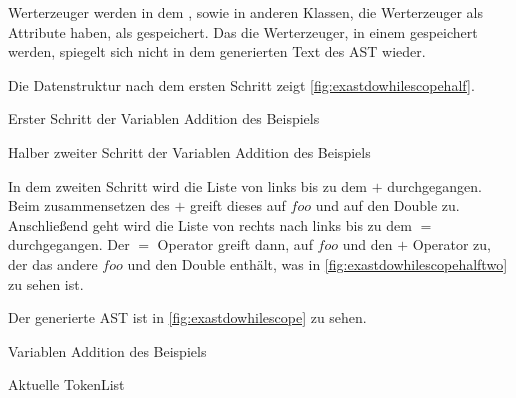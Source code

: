 {{        Werterzeuger werden in dem , sowie in anderen Klassen, die Werterzeuger als Attribute haben, als  gespeichert. Das die Werterzeuger, in einem  gespeichert werden, spiegelt sich nicht in dem generierten Text des AST wieder.

        Die Datenstruktur nach dem ersten Schritt zeigt \autoref{fig:exastdowhilescopehalf}.
        \begin{paracol}{2}
          \begin{myCodeEnv}
            \centering
            \begin{myInvBox}[width=.9\linewidth]
              
            \end{myInvBox}
            \caption{Erster Schritt der Variablen Addition des Beispiels}
            \label{fig:exastdowhilescopehalf}
          \end{myCodeEnv}
          \switchcolumn
          \begin{myCodeEnv}
            \centering
            \begin{myInvBox}[width=.9\linewidth]
              
            \end{myInvBox}
            \caption{Halber zweiter Schritt der Variablen Addition des Beispiels}
            \label{fig:exastdowhilescopehalftwo}
          \end{myCodeEnv}
        \end{paracol}

        In dem zweiten Schritt wird die Liste von links bis zu dem \myMIn$+$ durchgegangen. Beim zusammensetzen des \myMIn$+$ greift dieses auf \myMIn$foo$ und auf den Double zu. Anschließend geht wird die Liste von rechts nach links bis zu dem \myMIn$=$ durchgegangen. Der \myMIn$=$ Operator greift dann, auf \myMIn$foo$ und den \myMIn$+$ Operator zu, der das andere \myMIn$foo$ und den Double enthält, was in \autoref{fig:exastdowhilescopehalftwo} zu sehen ist.

        Der generierte AST ist in \autoref{fig:exastdowhilescope} zu sehen.
        \begin{paracol}{2}
          \begin{myCodeEnv}
            \centering
            \begin{myInvBox}[width=.9\linewidth]
              
            \end{myInvBox}
            \caption{Variablen Addition des Beispiels}
            \label{fig:exastdowhilescope}
          \end{myCodeEnv}
          \switchcolumn
          \begin{myCodeEnv}
            \centering
            \begin{myInvBox}[width=.9\linewidth]
              
            \end{myInvBox}
            \caption*{Aktuelle TokenList}
          \end{myCodeEnv}
        \end{paracol}

}}
